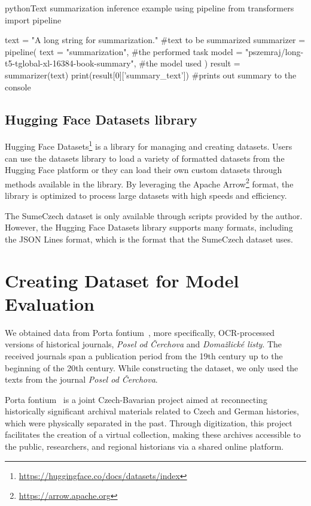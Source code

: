 \documentclass[english, ba, kiv, he, iso690numb, pdf, viewonly]{fasthesis}
\begin{document}
\begin{code}{python}{Text summarization inference example using pipeline\label{hf:pipeline_example}}
from transformers import pipeline

text = "A long string for summarization." #text to be summarized
summarizer = pipeline(
    text = "summarization", #the performed task 
    model = "pszemraj/long-t5-tglobal-xl-16384-book-summary", #the model used
)
result = summarizer(text)
print(result[0]['summary_text']) #prints out summary to the console
\end{code}
\subsection{Hugging Face Datasets library}
Hugging Face Datasets\footnote{\url{https://huggingface.co/docs/datasets/index}} is a library for managing and creating datasets. Users can use the datasets library to load a variety of formatted datasets from the Hugging Face platform or they can load their own custom datasets through methods available in the library. By leveraging the Apache Arrow\footnote{\url{https://arrow.apache.org}} format, the library is optimized to process large datasets with high speeds and efficiency.

The SumeCzech dataset is only available through scripts provided by the author. However, the Hugging Face Datasets library supports many formats, including the JSON Lines format, which is the format that the SumeCzech dataset uses. 

\section{Creating Dataset for Model Evaluation} \label{impl:dataset}
We obtained data from Porta fontium~\cite{statni-oblastni-archiv-v-plzni-no-date}, more specifically, OCR-processed versions of historical journals, \textit{Posel od Čerchova} and \textit{Domažlické listy}. The received journals span a publication period from the 19th century up to the beginning of the 20th century. While constructing the dataset, we only used the texts from the journal \textit{Posel od Čerchova}.

Porta fontium~\cite{statni-oblastni-archiv-v-plzni-no-date} is a joint Czech-Bavarian project aimed at reconnecting historically significant archival materials related to Czech and German histories, which were physically separated in the past. Through digitization, this project facilitates the creation of a virtual collection, making these archives accessible to the public, researchers, and regional historians via a shared online platform.
\end{document}
